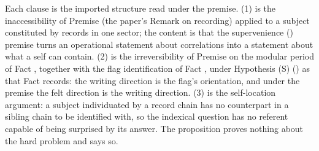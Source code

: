 Each clause is the imported structure read under the premise. (1) is the inaccessibility of Premise  (the paper's Remark on recording) applied to a subject constituted by records in one sector; the content is that the supervenience () premise turns an operational statement about correlations into a statement about what a self can contain. (2) is the irreversibility of Premise  on the modular period of Fact , together with the flag identification of Fact , under Hypothesis (S) () as that Fact records: the writing direction is the flag's orientation, and under the premise the felt direction is the writing direction. (3) is the self-location argument: a subject individuated by a record chain has no counterpart in a sibling chain to be identified with, so the indexical question has no referent capable of being surprised by its answer. The proposition proves nothing about the hard problem and says so.
